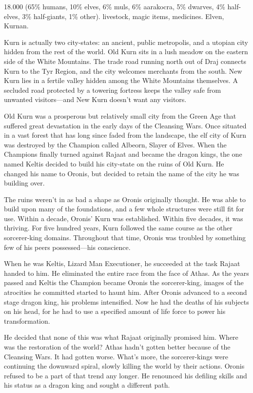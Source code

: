 {18.000 (65\% humans, 10\% elves, 6\% muls, 6\% aarakocra, 5\% dwarves, 4\% half-elves, 3\% half-giants, 1\% other).}
{livestock, magic items, medicines.}
{Elven, Kurnan.}
{
	Kurn is actually two city-states: an ancient, public metropolis, and a utopian city hidden from the rest of the world. Old Kurn sits in a lush meadow on the eastern side of the White Mountains. The trade road running north out of Draj connects Kurn to the Tyr Region, and the city welcomes merchants from the south. New Kurn lies in a fertile valley hidden among the White Mountains themselves. A secluded road protected by a towering fortress keeps the valley safe from unwanted visitors---and New Kurn doesn't want any visitors.

	Old Kurn was a prosperous but relatively small city from the Green Age that suffered great devastation in the early days of the Cleansing Wars. Once situated in a vast forest that has long since faded from the landscape, the elf city of Kurn was destroyed by the Champion called Albeorn, Slayer of Elves. When the Champions finally turned against Rajaat and became the dragon kings, the one named Keltis decided to build his city-state on the ruins of Old Kurn. He changed his name to Oronis, but decided to retain the name of the city he was building over.

	The ruins weren't in as bad a shape as Oronis originally thought. He was able to build upon many of the foundations, and a few whole structures were still fit for use. Within a decade, Oronis' Kurn was established. Within five decades, it was thriving. For five hundred years, Kurn followed the same course as the other sorcerer-king domains. Throughout that time, Oronis was troubled by something few of his peers possessed---his conscience.

	When he was Keltis, Lizard Man Executioner, he succeeded at the task Rajaat handed to him. He eliminated the entire race from the face of Athas. As the years passed and Keltis the Champion became Oronis the sorcerer-king, images of the atrocities he committed started to haunt him. After Oronis advanced to a second stage dragon king, his problems intensified. Now he had the deaths of his subjects on his head, for he had to use a specified amount of life force to power his transformation.

	He decided that none of this was what Rajaat originally promised him. Where was the restoration of the world? Athas hadn't gotten better because of the Cleansing Wars. It had gotten worse. What's more, the sorcerer-kings were continuing the downward spiral, slowly killing the world by their actions. Oronis refused to be a part of that trend any longer. He renounced his defiling skills and his status as a dragon king and sought a different path.

}
